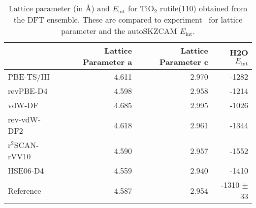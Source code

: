 \begin{table}
\caption{\label{tab:lattice_parametersr-tio2}Lattice parameter (in \AA{}) and  $E_\textrm{int}$ for TiO$_2$ rutile(110) obtained from the DFT ensemble. These are compared to experiment~\cite{burdettStructuralelectronicRelationshipsInorganic1987} for lattice parameter and the autoSKZCAM $E_\textrm{int}$.}
\begin{tabular}{lrrr}
\toprule
 & Lattice Parameter a & Lattice Parameter c & H2O $E_\textrm{int}$ \\ 
\midrule
PBE-TS/HI & 4.611 & 2.970 & -1282 \\
revPBE-D4 & 4.598 & 2.958 & -1214 \\
vdW-DF & 4.685 & 2.995 & -1026 \\
rev-vdW-DF2 & 4.618 & 2.961 & -1344 \\
r$^2$SCAN-rVV10 & 4.590 & 2.957 & -1552 \\
HSE06-D4 & 4.559 & 2.940 & -1410 \\
Reference & 4.587 & 2.954 & -1310 $\pm$ 33 \\
\bottomrule
\end{tabular}
\end{table}
